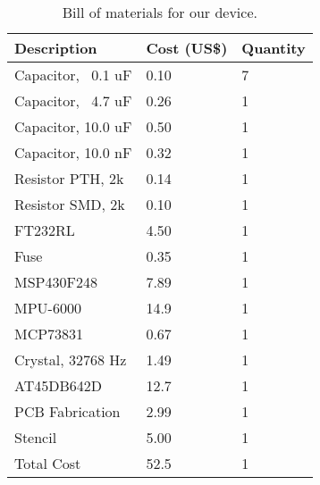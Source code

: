 \begin{table}[h]
\centering
\begin{tabular}{@{}lll@{}}
\toprule
Description                      & Cost (US\$)                      & Quantity               \\ \midrule
Capacitor, ~0.1 uF                 & 0.10                       & 7                      \\
Capacitor, ~4.7 uF                 & 0.26                      & 1                      \\
Capacitor, 10.0 uF                  & 0.50                       & 1                      \\
Capacitor, 10.0 nF                  & 0.32                      & 1                      \\
Resistor PTH, 2k                 & 0.14                      & 1                      \\
Resistor SMD, 2k                 & 0.10                       & 1                      \\
FT232RL                          & 4.50                       & 1                      \\
Fuse	                         & 0.35                      & 1                      \\
MSP430F248                       & 7.89                      & 1                      \\
MPU-6000                         & 14.9                      & 1                      \\
MCP73831                         & 0.67                      & 1                      \\
Crystal, 32768 Hz                & 1.49                      & 1                      \\
AT45DB642D                       & 12.7                      & 1                      \\
PCB Fabrication                  & 2.99                      & 1                      \\
Stencil                          & 5.00                         & 1                      \\ \midrule
Total Cost & 52.5 &	1\\ \bottomrule
\end{tabular}
\caption{Bill of materials for our device.}
\label{BomTable}
\end{table}